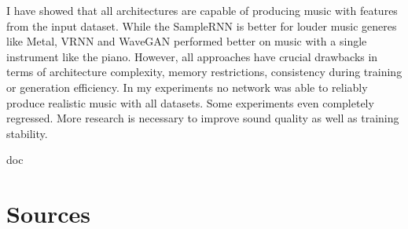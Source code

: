 \documentclass[12pt]{article}
\begin{document}
I have showed that all architectures are capable of producing music with features from the input dataset.
While the SampleRNN is better for louder music generes like Metal, VRNN and WaveGAN performed better on music with a single instrument like the piano.
However, all approaches have crucial drawbacks in terms of architecture complexity, memory restrictions, consistency during training or generation efficiency.
In my experiments no network was able to reliably produce realistic music with all datasets.
Some experiments even completely regressed.
More research is necessary to improve sound quality as well as training stability.









\newpage

\begin{btSect}{doc} %
\section*{Sources}
\btPrintCited
\end{btSect}
\end{document}
